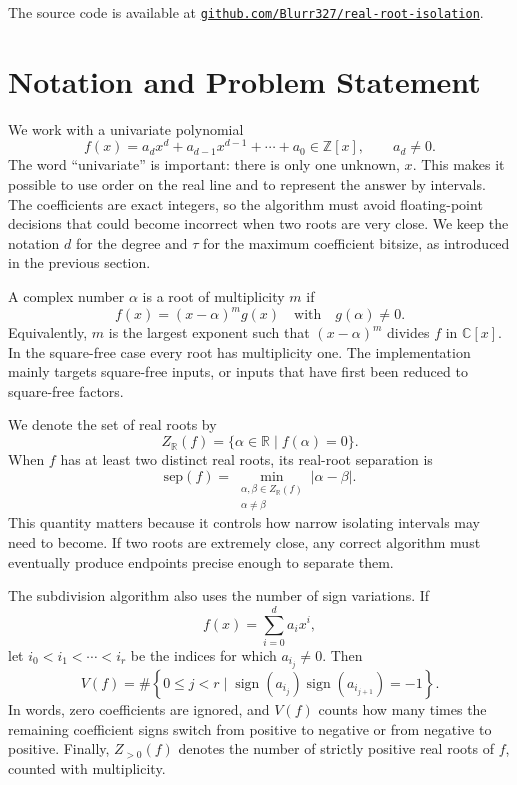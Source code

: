 \documentclass[letterpaper]{article}
\newcommand{\RR}{\mathbb{R}}
\newcommand{\ZZ}{\mathbb{Z}}
\newcommand{\roots}{Z_{\RR}}
\newcommand{\sep}{\mathrm{sep}}
\begin{document}
The source code is available at
\href{https://github.com/Blurr327/real-root-isolation}
{\texttt{github.com/Blurr327/real-root-isolation}}.

\section{Notation and Problem Statement}

We work with a univariate polynomial
\[
  f(x)=a_d x^d+a_{d-1}x^{d-1}+\cdots+a_0 \in \ZZ[x],
  \qquad a_d \neq 0.
\]
The word ``univariate'' is important: there is only one unknown, $x$. This
makes it possible to use order on the real line and to represent the answer by
intervals. The coefficients are exact integers, so the algorithm must avoid
floating-point decisions that could become incorrect when two roots are very
close. We keep the notation $d$ for the degree and $\tau$ for the maximum
coefficient bitsize, as introduced in the previous section.

A complex number $\alpha$ is a root of multiplicity $m$ if
\[
  f(x)=(x-\alpha)^m g(x)
  \quad\text{with}\quad g(\alpha)\neq 0.
\]
Equivalently, $m$ is the largest exponent such that $(x-\alpha)^m$ divides
$f$ in $\mathbb{C}[x]$. In the square-free case every root has multiplicity
one. The implementation mainly targets square-free inputs, or inputs that have
first been reduced to square-free factors.

We denote the set of real roots by
\[
  \roots(f)=\{\alpha\in\RR \mid f(\alpha)=0\}.
\]
When $f$ has at least two distinct real roots, its real-root separation is
\[
  \sep(f)=
  \min_{\substack{\alpha,\beta\in\roots(f)\\ \alpha\neq\beta}}
  |\alpha-\beta|.
\]
This quantity matters because it controls how narrow isolating intervals may
need to become. If two roots are extremely close, any correct algorithm must
eventually produce endpoints precise enough to separate them.

The subdivision algorithm also uses the number of sign variations. If
\[
  f(x)=\sum_{i=0}^{d}a_i x^i,
\]
let $i_0<i_1<\cdots<i_r$ be the indices for which $a_{i_j}\neq 0$. Then
\[
  V(f)=
  \#\left\{
    0\leq j<r \mid
    \operatorname{sign}(a_{i_j})\operatorname{sign}(a_{i_{j+1}})=-1
  \right\}.
\]
In words, zero coefficients are ignored, and $V(f)$ counts how many times the
remaining coefficient signs switch from positive to negative or from negative
to positive. Finally, $Z_{>0}(f)$ denotes the number of strictly positive real
roots of $f$, counted with multiplicity.
\end{document}
